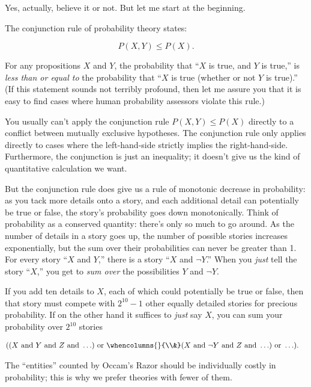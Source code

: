 {
 Yes, actually, believe it or not. But let me start at the
beginning.}

{
 The conjunction rule of probability theory states:}

\begin{equation*}
 P(X,Y) \leq P(X).
\end{equation*}


{
 For any propositions $X$ and $Y$, the probability that
``$X$ is true, and $Y$ is true,'' is
\textit{less than or equal to} the probability that
``$X$ is true (whether or not $Y$ is
true).'' (If this statement sounds not terribly
profound, then let me assure you that it is easy to find cases where
human probability assessors violate this rule.) }

{
 You usually can't apply the conjunction rule
$P(X,Y) \leq P(X)$ directly to a conflict between mutually exclusive
hypotheses. The conjunction rule only applies directly to cases where
the left-hand-side strictly implies the right-hand-side. Furthermore,
the conjunction is just an inequality; it doesn't give
us the kind of quantitative calculation we want.}

{
 But the conjunction rule does give us a rule of monotonic decrease
in probability: as you tack more details onto a story, and each
additional detail can potentially be true or false, the
story's probability goes down monotonically. Think of
probability as a conserved quantity: there's only so
much to go around. As the number of details in a story goes up, the
number of possible stories increases exponentially, but the sum over
their probabilities can never be greater than 1. For every story
``$X$ and $Y$,'' there is a story
``$X$ and $\lnot Y$.'' When you
\textit{just} tell the story ``$X$,''
you get to \textit{sum over} the possibilities $Y$ and $\lnot Y$.}

{
 If you add ten details to $X$, each of which could potentially be
true or false, then that story must compete with $2^{10}
- 1$ other equally detailed stories for precious probability. If on the
other hand it suffices to \textit{just} say $X$, you can sum your
probability over $2^{10}$ stories}

\begin{align*}
 (&(X\text{ and }Y\text{ and }Z\text{ and }\ldots)\text{ or }\whencolumns{}{\\&}(X\text{ and }\lnot Y\text{ and }Z\text{ and }\ldots)
\text{ or }\ldots).
\end{align*}

{
 The ``entities'' counted by
Occam's Razor should be individually costly in
probability; this is why we prefer theories with fewer of them. }

